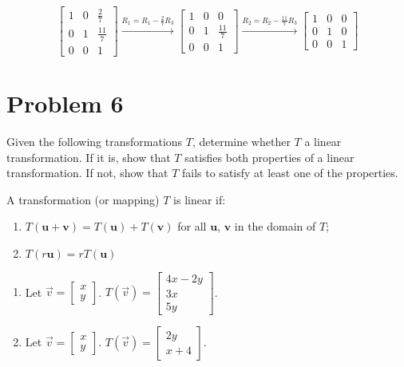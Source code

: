 \documentclass[letter,11pt]{article}
\begin{document}
\begin{tcolorbox}[boxrule=1mm, width=(.9\linewidth),before=\hfill,after=\hfill,adjusted title={Problem \# 5 Solutions}]
$$\begin{bmatrix}
1 & 0 & \frac{2}{7} \\
0 & 1 &  \frac{11}{7}\\
0 & 0 & 1
\end{bmatrix} \xrightarrow{R_1=R_1-\frac{2}{7}R_3}
\begin{bmatrix}
1 & 0 & 0 \\
0 & 1 &  \frac{11}{7}\\
0 & 0 & 1
\end{bmatrix}\xrightarrow{R_2=R_2-\frac{11}{7}R_3}
\begin{bmatrix}
1 & 0 & 0 \\
0 & 1 &  0\\
0 & 0 & 1
\end{bmatrix}$$

\end{tcolorbox}

\newpage
\section{Problem 6}
Given the following transformations $T$, determine whether $T$ a linear transformation. If it is, show that $T$ satisfies both properties of a linear transformation. If not, show that $T$ fails to satisfy at least one of the properties.
\begin{tcolorbox}
     A transformation (or mapping) $T$ is linear if:
    \begin{enumerate}
        \item $T\left(\boldsymbol{u}+\boldsymbol{v}\right) = T\left(\boldsymbol{u}\right)+T\left(\boldsymbol{v}\right)$ for all $\boldsymbol{u}$, $\boldsymbol{v}$ in the domain of $T$;
        \item $T\left(r\boldsymbol{u}\right) = r T\left(\boldsymbol{u}\right)$
    \end{enumerate}
\end{tcolorbox}
\begin{enumerate}[label = \roman*.]
    \item Let $\vec{v}=\begin{bmatrix}x \\ y\end{bmatrix}$. $T(\vec{v})=\begin{bmatrix}4 x-2 y \\ 3 x \\ 5 y\end{bmatrix}$.
    \item Let $\vec{v}=\begin{bmatrix}x \\ y\end{bmatrix}$. $T(\vec{v})=\begin{bmatrix}2 y \\ x+4\end{bmatrix}$.
\end{enumerate}
\end{document}
